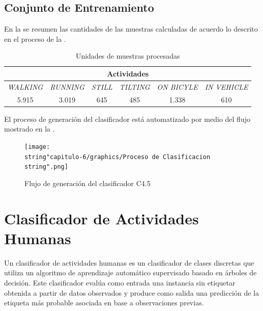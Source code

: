 \subsection{Conjunto de Entrenamiento }

En la  se resumen las cantidades de las muestras
calculadas de acuerdo lo descrito en el proceso de la .

\begin{table}[h]
\begin{centering}
\begin{tabular}{|c|c|c|c|c|c|}
\hline 
\multicolumn{6}{|c|}{Actividades}\tabularnewline
\hline 
\emph{\footnotesize{}WALKING} & \emph{\footnotesize{}RUNNING} & \emph{\footnotesize{}STILL} & \emph{\footnotesize{}TILTING} & \emph{\footnotesize{}ON BICYLE} & \emph{\footnotesize{}IN VEHICLE}\tabularnewline
\hline 
\hline 
5.915 & 3.019 & 645 & 485 & 1.338 & 610\tabularnewline
\hline 
\end{tabular}
\par\end{centering}
\caption{\label{tab6:muestras}Unidades de muestras procesadas}
\end{table}

El proceso de generación del clasificador está automatizado por medio
del flujo mostrado en la .

\begin{figure}[th]
\begin{centering}
\texttt{[image: \\string"capitulo-6/graphics/Proceso de Clasificacion\\string".png]}
\par\end{centering}
\caption{\label{fig6:proceso-clasi}Flujo de generación del clasificador C4.5}
\end{figure}


\section{Clasificador de Actividades Humanas}

\label{sec6:clasificacion}Un clasificador de actividades humanas
es un clasificador de clases discretas que utiliza un algoritmo de
aprendizaje automático supervisado basado en árboles de decisión.
Este clasificador evalúa como entrada una instancia sin etiquetar
obtenida a partir de datos observados y produce como salida una predicción
de la etiqueta más probable asociada en base a observaciones previas.

